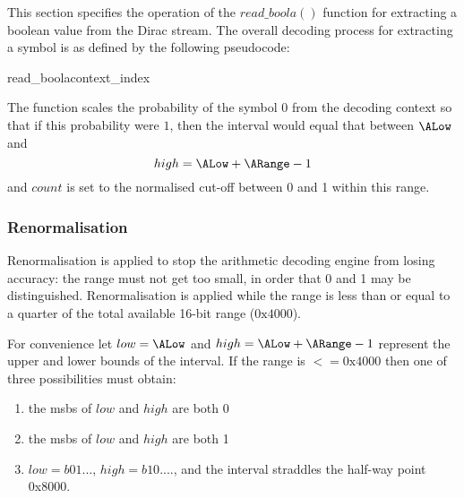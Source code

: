 This section specifies the operation of the $read\_boola()$ function
for extracting a boolean value from the Dirac stream. The overall decoding
process for extracting a symbol is as defined by the following
pseudocode:

\begin{pseudo}{read\_boola}{context\_index}
\bsELSE
\bsEND
{}
\bsEND
{}
\end{pseudo}

\begin{informative}
The function scales the probability of the symbol $0$ from the decoding context
so that if this probability were $1$, then the interval would equal that between
 $\ALow$ and 
 \[high=\ALow+\ARange-1\]
and $count$ is set to the normalised cut-off between 0 and 1 within this range.
\end{informative}

\subsubsection{Renormalisation}
\label{renormalisation}

Renormalisation is applied to stop the arithmetic decoding 
engine from losing accuracy: the range must not get too small,
 in order that 0 and 1 may be distinguished. Renormalisation is
 applied while the range is less than or equal to a quarter of 
 the total available 16-bit range ($\text{0x4000}$). 

For convenience let $low=\ALow$ and $high=\ALow+\ARange-1$ 
represent the upper and lower bounds of the interval. If the
range is $<=\text{0x4000}$ then
one of three possibilities must obtain:
\begin{enumerate}
\item the msbs of $low$ and $high$ are both 0
\item the msbs of $low$ and $high$ are both 1
\item $low=b01...$, $high=b10....$,  and the interval straddles the half-way point 0x8000. 
\end{enumerate}

